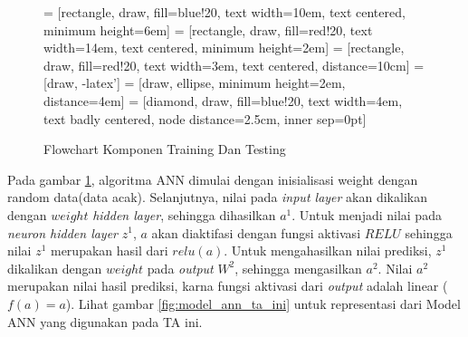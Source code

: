 \begin{figure}[ht]
  \caption{Flowchart Komponen Training Dan Testing}
  \begin{center}
    \footnotesize
     = [rectangle, draw, fill=blue!20, 
        text width=10em, text centered, minimum height=6em]
     = [rectangle, draw, fill=red!20, 
        text width=14em, text centered, minimum height=2em]
     = [rectangle, draw, fill=red!20, 
        text width=3em, text centered,  distance=10cm]
     = [draw, -latex']
     = [draw, ellipse, minimum height=2em, distance=4em]
     = [diamond, draw, fill=blue!20, 
        text width=4em, text badly centered, node distance=2.5cm, inner sep=0pt]
        
  \end{center}
  \label{fig:alur_ann}
\end{figure}
\FloatBarrier

Pada gambar \ref{fig:alur_ann}, algoritma ANN dimulai dengan inisialisasi weight dengan random data(data acak). Selanjutnya, nilai pada \emph{input layer} akan dikalikan dengan $weight$ \emph{hidden layer}, sehingga dihasilkan $a^1$. Untuk menjadi nilai pada \emph{neuron hidden layer} $z^1$, $a$ akan diaktifasi dengan fungsi aktivasi $RELU$ sehingga nilai $z^1$ merupakan hasil dari $relu(a)$. Untuk mengahasilkan nilai prediksi, $z^1$ dikalikan dengan $weight$ pada \emph{output} $W^2$, sehingga mengasilkan $a^2$. Nilai $a^2$ merupakan nilai hasil prediksi, karna fungsi aktivasi dari \emph{output} adalah linear ($f(a) = a$). Lihat gambar \ref{fig:model_ann_ta_ini} untuk representasi dari Model ANN yang digunakan pada TA ini.

\FloatBarrier
